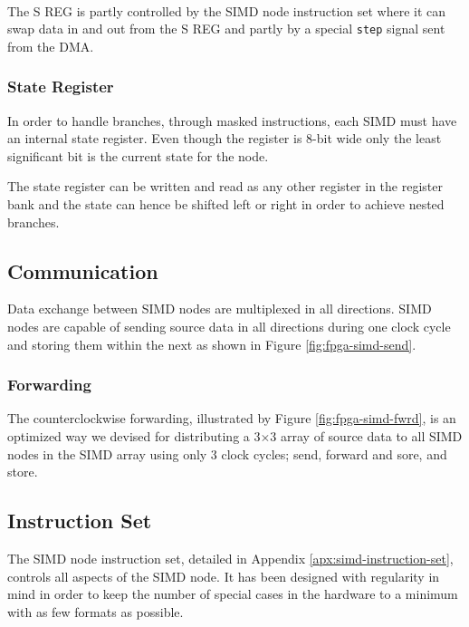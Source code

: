  

The S REG is partly controlled by the \ac{SIMD} node instruction set where it
can swap data in and out from the S REG and partly by a special {\tt step} signal
sent from the \ac{DMA}.

\subsubsection{State Register}
In order to handle branches, through masked instructions, each \ac{SIMD} must have an
internal state register. Even though the register is 8-bit wide only the least 
significant bit is the current state for the node.

The state register can be written and read as any other register in the register
bank and the state can hence be shifted left or right in order to achieve nested
branches.

\subsection{Communication}\label{sec:simd-com}

Data exchange between \ac{SIMD} nodes are multiplexed in all directions. \ac{SIMD} nodes
are capable of sending source data in all directions during one clock cycle and storing
them within the next as shown in Figure \ref{fig:fpga-simd-send}.



\subsubsection{Forwarding}
The counterclockwise forwarding, illustrated by Figure \ref{fig:fpga-simd-fwrd}, is an 
optimized way we devised for distributing a 3$\times$3 array of source data to all 
\ac{SIMD} nodes in the \ac{SIMD} array using only 3 clock cycles; send, forward and sore, 
and store.




\subsection{Instruction Set}
The \ac{SIMD} node instruction set, detailed in Appendix
\ref{apx:simd-instruction-set}, controls all aspects of the \ac{SIMD} node. It
has been designed with regularity in mind in order to keep the number of special
cases in the hardware to a minimum with as few formats as possible.

